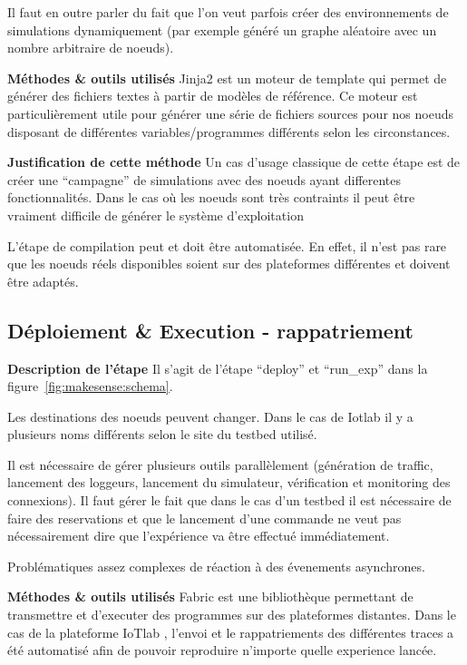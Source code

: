 Il faut en outre parler du fait que l'on veut parfois créer des environnements
de simulations dynamiquement (par exemple généré un graphe aléatoire avec un
nombre arbitraire de noeuds). 

\textbf{Méthodes \& outils utilisés} Jinja2 \cite{jinja2} est un moteur de
template qui permet de générer des fichiers textes à partir de modèles de
référence. Ce moteur est particulièrement utile pour générer une série de
fichiers sources pour nos noeuds disposant de différentes variables/programmes
différents selon les circonstances.

\textbf{Justification de cette méthode} Un cas d'usage classique de cette
étape est de créer une ``campagne'' de simulations avec des noeuds ayant
differentes fonctionnalités. Dans le cas où les noeuds sont très contraints il
peut être vraiment difficile de générer le système d'exploitation

L'étape de compilation peut et doit être automatisée. En effet, il n'est pas
rare que les noeuds réels disponibles soient sur des plateformes différentes
et doivent être adaptés.

\subsection{Déploiement \& Execution - rappatriement}

\textbf{Description de l'étape} Il s'agit de  l'étape ``deploy'' et
``run\_exp'' dans la figure~\ref{fig:makesense:schema}.

Les destinations des noeuds peuvent changer. Dans le cas de Iotlab il y a plusieurs
noms différents selon le site du testbed utilisé.

Il est nécessaire de gérer plusieurs outils parallèlement (génération de
traffic, lancement des loggeurs, lancement du simulateur, vérification et
monitoring des connexions).
Il faut gérer le fait que dans le cas d'un testbed il est nécessaire de
faire des reservations et que le lancement d'une commande ne veut pas nécessairement
dire que l'expérience va être effectué immédiatement.

Problématiques assez complexes de réaction à des évenements asynchrones.

\textbf{Méthodes \& outils utilisés} Fabric \cite{fabric} est une bibliothèque
permettant de transmettre et d'executer des programmes sur des plateformes
distantes. Dans le cas de la plateforme IoTlab \cite{fleury2015fit}, l'envoi
et le rappatriements des différentes traces a été automatisé afin de pouvoir
reproduire n'importe quelle experience lancée.

